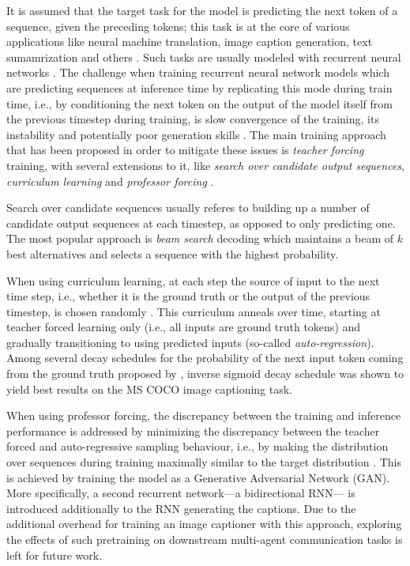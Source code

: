 It is assumed that the target task for the model is predicting the next token of a sequence, given the preceding tokens; this task is at the core of various applications like neural machine translation, image caption generation, text sumamrization and others \parencite[e.~g.,][]{cho2014learning, sutskever2014sequence}. Such tasks are usually modeled with recurrent neural networks \parencite{rumelhart1986learning}. The challenge when training recurrent neural network models which are predicting sequences at inference time by replicating this mode during train time, i.e., by conditioning the next token on the output of the model itself from the previous timestep during training, is slow convergence of the training, its instability and potentially poor generation skills \parencite{lamb2016professor}. The main training approach that has been proposed in order to mitigate these issues is \textit{teacher forcing} training, with several extensions to it, like \textit{search over candidate output sequences}, \textit{curriculum learning} and \textit{professor forcing} \parencite{goodfellow2016deep, williams1989algorithm}.

Search over candidate sequences usually referes to building up a number of candidate output sequences at each timestep, as opposed to only predicting one. The most popular approach is \textit{beam search} decoding which maintains a beam of $k$ best alternatives and selects a sequence with the highest probability.

When using curriculum learning, at each step the source of input to the next time step, i.e., whether it is the ground truth or the output of the previous timestep, is chosen randomly \parencite{bengio2015scheduled}. This curriculum anneals over time, starting at teacher forced learning only (i.e., all inputs are ground truth tokens) and gradually transitioning to using predicted inputs (so-called \textit{auto-regression}). Among several decay schedules for the probability of the next input token coming from the ground truth proposed by \cite{bengio2015scheduled}, inverse sigmoid decay schedule  was shown to yield best results on the MS COCO image captioning task.

When using professor forcing, the discrepancy between the training and inference performance is addressed by minimizing the discrepancy between the teacher forced and auto-regressive sampling behaviour, i.e., by making the distribution over sequences during training maximally similar to the target distribution \parencite{lamb2016professor}. This is achieved by training the model as a Generative Adversarial Network (GAN). More specifically, a second recurrent network---a bidirectional RNN---  is introduced additionally to the RNN generating the captions. Due to the additional overhead for training an image captioner with this approach, exploring the effects of such pretraining on downstream multi-agent communication tasks is left for future work.

